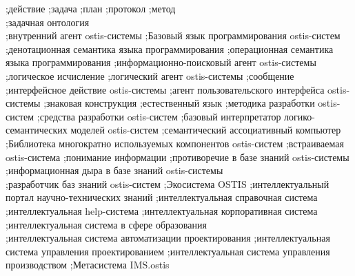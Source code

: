 {	
;действие
;задача
;план
;протокол
;метод\\
;задачная онтология\\
;внутренний агент ostis-системы
;Базовый язык программирования ostis-систем\\
;денотационная семантика языка программирования
;операционная семантика языка программирования
;информационно-поисковый агент ostis-системы
;логическое исчисление
;логический агент ostis-системы
;сообщение
;интерфейсное действие ostis-системы
;агент пользовательского интерфейса ostis-системы
;знаковая конструкция
;естественный язык
;методика разработки ostis-систем
;средства разработки ostis-систем
;базовый интерпретатор логико-семантических моделей ostis-систем
;семантический ассоциативный компьютер
;Библиотека многократно используемых компонентов ostis-систем
;встраиваемая ostis-система
;понимание информации
;противоречие в базе знаний ostis-системы
;информационная дыра в базе знаний ostis-системы\\
;разработчик баз знаний ostis-систем
;Экосистема OSTIS
;интеллектуальный портал научно-технических знаний
;интеллектуальная справочная система
;интеллектуальная help-система
;интеллектуальная корпоративная система
;интеллектуальная система в сфере образования\\
;интеллектуальная система автоматизации проектирования
;интеллектуальная система управления проектированием
;интеллектуальная система управления производством
;Метасистема IMS.ostis
}